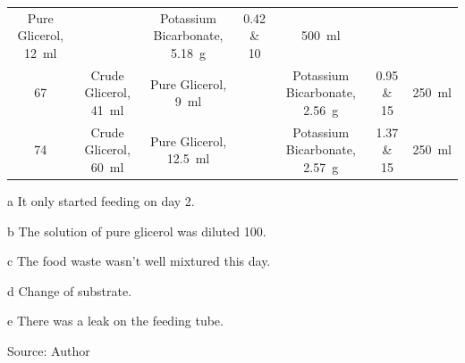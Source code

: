 \begin{ThreePartTable}
\begin{xltabular}{\linewidth}{@{} C C C C C C C @{}}
    Pure Glicerol, \qty{12}{\milli\litre} &
    &
    Potassium Bicarbonate, \qty{5.18}{\gram} &
    \num{0.42} \& \num{10} &
    \qty{500}{\milli\litre} \\
    \addlinespace
    \num{67} &
    Crude Glicerol, \qty{41}{\milli\litre} &
    Pure Glicerol, \qty{9}{\milli\litre} &
    &
    Potassium Bicarbonate, \qty{2.56}{\gram} &
    \num{0.95} \& \num{15} &
    \qty{250}{\milli\litre} \\
    \addlinespace
    \num{74} &
    Crude Glicerol, \qty{60}{\milli\litre} &
    Pure Glicerol, \qty{12.5}{\milli\litre} &
    &
    Potassium Bicarbonate, \qty{2.57}{\gram} &
    \num{1.37} \& \num{15} &
    \qty{250}{\milli\litre} \\

    \end{xltabular}

    \begin{tablenotes}
        \item[a] It only started feeding on day \num{2}.
        \item[b] The solution of pure glicerol was diluted \qty{100}{\dil}.
        \item[c] The food waste wasn't well mixtured this day.
        \item[d] Change of substrate.
        \item[e] There was a leak on the feeding tube.
        \newline
        \item Source: Author
    \end{tablenotes}
\end{ThreePartTable}
\endgroup
